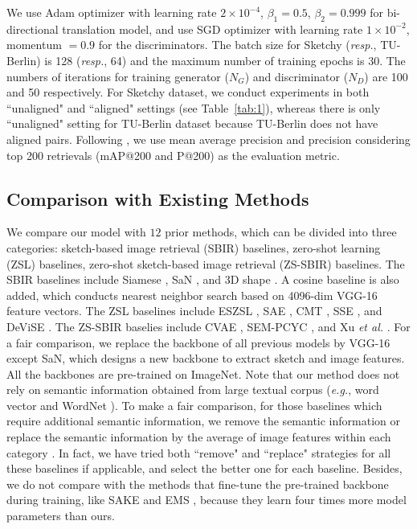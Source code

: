 \documentclass[10pt,twocolumn,letterpaper]{article}
\begin{document}
We use Adam \cite{kingma2014adam} optimizer with learning rate $2 \times 10^{-4}$, $\beta_1 = 0.5$, $\beta_2 = 0.999$ for bi-directional translation model, and use SGD optimizer with learning rate $1 \times 10^{-2}$, momentum $=0.9$ for the discriminators. The batch size for Sketchy (\emph{resp.}, TU-Berlin) is 128 (\emph{resp.}, 64) and the maximum number of training epochs is 30. The numbers of iterations for training generator ($N_{G}$) and discriminator ($N_{D}$) are 100 and 50 respectively. For Sketchy dataset, we conduct experiments in both ``unaligned" and ``aligned" settings (see Table~\ref{tab:1}), whereas there is only ``unaligned" setting for TU-Berlin dataset because TU-Berlin does not have aligned pairs. Following \cite{yelamarthi2018zero}, we use mean average precision and precision considering top 200 retrievals (mAP@200 and P@200) as the evaluation metric.

\subsection{Comparison with Existing Methods}
We compare our model with $12$ prior methods, which can be divided into three categories: sketch-based image retrieval (SBIR) baselines, zero-shot learning (ZSL) baselines, zero-shot sketch-based image retrieval (ZS-SBIR) baselines. 
The SBIR baselines include Siamese \cite{qi2016sketch}, SaN \cite{yu2017sketch}, and 3D shape \cite{wang2015sketch}. A cosine baseline is also added, which conducts nearest neighbor search based on 4096-dim VGG-16 \cite{simonyan2014very} feature vectors.
The ZSL baselines include ESZSL \cite{romera2015embarrassingly}, SAE \cite{kodirov2017semantic}, CMT \cite{socher2013zero}, SSE \cite{zhang2015zero}, and DeViSE \cite{frome2013devise}.
The ZS-SBIR baselies include CVAE \cite{yelamarthi2018zero}, SEM-PCYC \cite{dutta2019semantically}, and Xu \textit{et al.} \cite{xu2019semantic}.
For a fair comparison, we replace the backbone of all previous models by VGG-16 except SaN, which designs a new backbone to extract sketch and image features. 
All the backbones are pre-trained on ImageNet. 
Note that our method does not rely on semantic information obtained from large textual corpus (\emph{e.g.}, word vector \cite{mikolov2013distributed} and WordNet \cite{miller1998wordnet}). To make a fair comparison, for those baselines which require additional semantic information, we remove the semantic information \cite{dutta2019semantically} or replace the semantic information by the average of image features within each category \cite{wang2015sketch, romera2015embarrassingly, kodirov2017semantic, socher2013zero, zhang2015zero, frome2013devise, xu2019semantic} \protect\footnotemark. In fact, we have tried both ``remove" and ``replace" strategies for all these baselines if applicable, and select the better one for each baseline.
Besides, we do not compare with the methods that fine-tune the pre-trained backbone during training, like SAKE \cite{liu2019semantic} and EMS \cite{lu2018learning}, because they learn four times more model parameters than ours.
\end{document}
